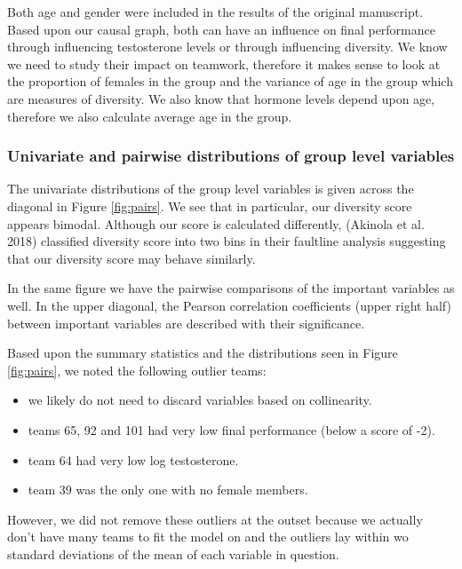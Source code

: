 \documentclass[]{article}
\providecommand{\tightlist}{%
  \setlength{\itemsep}{0pt}\setlength{\parskip}{0pt}}
\begin{document}
Both age and gender were included in the results of the original
manuscript. Based upon our causal graph, both can have an influence on
final performance through influencing testosterone levels or through
influencing diversity. We know we need to study their impact on
teamwork, therefore it makes sense to look at the proportion of females
in the group and the variance of age in the group which are measures of
diversity. We also know that hormone levels depend upon age, therefore
we also calculate average age in the group.

\subsubsection{Univariate and pairwise distributions of group level
variables}\label{univariate-and-pairwise-distributions-of-group-level-variables}

The univariate distributions of the group level variables is given
across the diagonal in Figure \ref{fig:pairs}. We see that in
particular, our diversity score appears bimodal. Although our score is
calculated differently, (Akinola et al. 2018) classified diversity score
into two bins in their faultline analysis suggesting that our diversity
score may behave similarly.

In the same figure we have the pairwise comparisons of the important
variables as well. In the upper diagonal, the Pearson correlation
coefficients (upper right half) between important variables are
described with their significance.

Based upon the summary statistics and the distributions seen in Figure
\ref{fig:pairs}, we noted the following outlier teams:

\begin{itemize}
\tightlist
\item
  we likely do not need to discard variables based on collinearity.
\item
  teams 65, 92 and 101 had very low final performance (below a score of
  -2).
\item
  team 64 had very low log testosterone.
\item
  team 39 was the only one with no female members.
\end{itemize}

However, we did not remove these outliers at the outset because we
actually don't have many teams to fit the model on and the outliers lay
within wo standard deviations of the mean of each variable in question.
\end{document}
